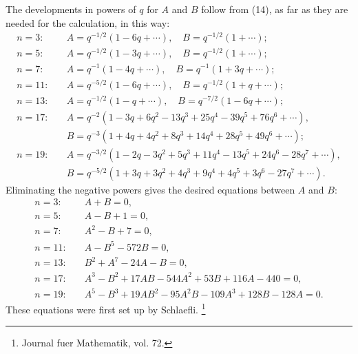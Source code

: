 \documentclass[11pt]{article}
\begin{document}
The developments in powers of $q$ for $A$ and $B$ follow from (14), as far as they are needed for the calculation, in this way:
\begin{align*}
 n=3:&\quad A=q^{-1/2}(1-6q+\cdots),\quad B=q^{-1/2}(1+\cdots);\\
 n=5:&\quad A=q^{-1/2}(1-3q+\cdots),\quad B=q^{-1/2}(1+\cdots);\\
 n=7:&\quad A=q^{-1}(1-4q+\cdots),\quad B=q^{-1}(1+3q+\cdots);\\
 n=11:&\quad A=q^{-5/2}(1-6q+\cdots),\quad B=q^{-1/2}(1+q+\cdots);\\
 n=13:&\quad A=q^{-1/2}(1-q+\cdots),\quad B=q^{-7/2}(1-6q+\cdots);\\
 n=17:&\quad A=q^{-2}(1-3q+6q^2-13q^3+25q^4-39q^5+76q^6+\cdots),\\
     &\quad B=q^{-3}(1+4q+4q^2+8q^3+14q^4+28q^5+49q^6+\cdots);\\
 n=19:&\quad A=q^{-3/2}(1-2q-3q^2+5q^3+11q^4-13q^5+24q^6-28q^7+\cdots),\\
     &\quad B=q^{-5/2}(1+3q+3q^2+4q^3+9q^4+4q^5+3q^6-27q^7+\cdots).
\end{align*}
Eliminating the negative powers gives the desired equations between $A$ and $B$:
\begin{align*}
 n=3:&\quad A+B=0,\\
 n=5:&\quad A-B+1=0,\\
 n=7:&\quad A^2-B+7=0,\\
 n=11:&\quad A-B^5-572B=0,\\
 n=13:&\quad B^2+A^7-24A-B=0,\\
 n=17:&\quad A^3-B^2+17AB-544A^2+53B+116A-440=0,\\
 n=19:&\quad A^5-B^3+19AB^2-95A^2B-109A^3+128B-128A=0.
\end{align*}
These equations were first set up by Schlaefli.
\footnote{Journal fuer Mathematik, vol. 72.}
\end{document}

